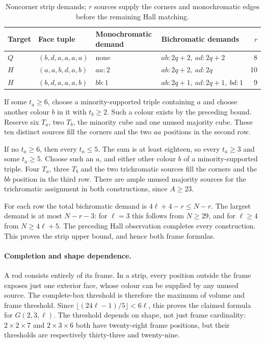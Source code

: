 \begin{table}[ht]
\centering
\begin{tabular}{llllr}
\toprule
Target & Face tuple & Monochromatic demand & Bichromatic demands & $r$\\
\midrule
$Q$ & $(b,d,a,a,a,a)$ & none & $ab:2q+2,\ ad:2q+2$ & 8\\
$H$ & $(a,a,b,d,a,b)$ & $aa:2$ & $ab:2q+2,\ ad:2q$ & 10\\
$H$ & $(b,d,a,a,a,b)$ & $bb:1$ & $ab:2q+1,\ ad:2q+1,\ bd:1$ & 9\\
\bottomrule
\end{tabular}
\caption{Noncorner strip demands; $r$ sources supply the corners and
monochromatic edges before the remaining Hall matching.}
\label{tab:thin-demands}
\end{table}

If some $t_a\ge6$, choose a minority-supported triple containing $a$ and
choose another colour $b$ in it with $t_b\ge2$. Such a colour exists by
the preceding bound. Reserve six $T_a$, two $T_b$, the minority cube and
one unused majority cube. These ten distinct sources fill the corners
and the two $aa$ positions in the second row.

If no $t_a\ge6$, then every $t_a\le5$. The sum is at least eighteen,
so every $t_a\ge3$ and some $t_a\ge5$. Choose such an $a$, and either
other colour $b$ of a minority-supported triple. Four $T_a$, three $T_b$
and the two trichromatic sources fill the corners and the $bb$ position
in the third row. There are ample unused majority sources for the
trichromatic assignment in both constructions, since $A\ge23$.

For each row the total bichromatic demand is $4\ell+4-r\le N-r$.
The largest demand is at most $N-r-3$: for $\ell=3$ this follows from
$N\ge29$, and for $\ell\ge4$ from $N\ge4\ell+5$.
The preceding Hall observation completes every construction. This proves
the strip upper bound, and hence both frame formulas.

\paragraph{Completion and shape dependence.}
A rod consists entirely of its frame. In a strip, every position outside
the frame exposes just one exterior face, whose colour can be supplied by
any unused source. The complete-box threshold is therefore the maximum of
volume and frame threshold. Since $\lfloor(24\ell-1)/5\rfloor<6\ell$,
this proves the claimed formula for $G(2,3,\ell)$.
The threshold depends on shape, not just frame cardinality:
$2\times2\times7$ and $2\times3\times6$ both have twenty-eight frame
positions, but their thresholds are respectively thirty-three and
twenty-nine.
